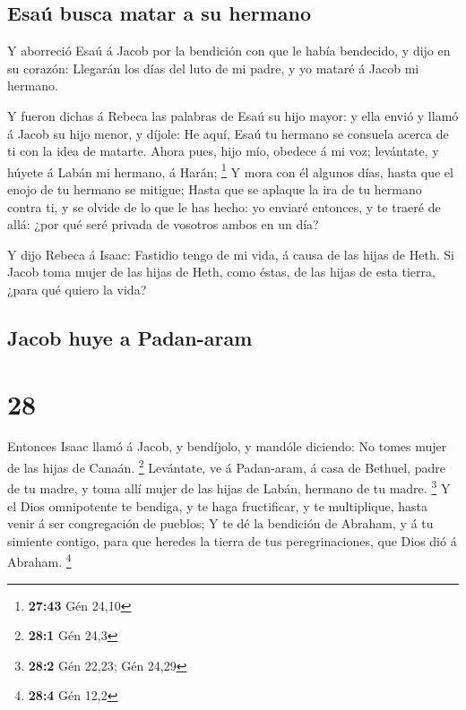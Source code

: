 \hypertarget{esauxfa-busca-matar-a-su-hermano}{%
\subsection{Esaú busca matar a su
hermano}\label{esauxfa-busca-matar-a-su-hermano}}

 Y aborreció Esaú á Jacob por la bendición con que le había
bendecido, y dijo en su corazón: Llegarán los días del luto de mi padre,
y yo mataré á Jacob mi hermano.

 Y fueron dichas á Rebeca las palabras de Esaú su hijo
mayor: y ella envió y llamó á Jacob su hijo menor, y díjole: He aquí,
Esaú tu hermano se consuela acerca de ti con la idea de matarte.
 Ahora pues, hijo mío, obedece á mi voz; levántate, y
húyete á Labán mi hermano, á Harán; \footnote{\textbf{27:43} Gén 24,10}
 Y mora con él algunos días, hasta que el enojo de tu
hermano se mitigue;  Hasta que se aplaque la ira de tu
hermano contra ti, y se olvide de lo que le has hecho: yo enviaré
entonces, y te traeré de allá: ¿por qué seré privada de vosotros ambos
en un día?

 Y dijo Rebeca á Isaac: Fastidio tengo de mi vida, á causa
de las hijas de Heth. Si Jacob toma mujer de las hijas de Heth, como
éstas, de las hijas de esta tierra, ¿para qué quiero la vida?

\hypertarget{jacob-huye-a-padan-aram}{%
\subsection{Jacob huye a Padan-aram}\label{jacob-huye-a-padan-aram}}

\hypertarget{section-27}{%
\section{28}\label{section-27}}

 Entonces Isaac llamó á Jacob, y bendíjolo, y mandóle
diciendo: No tomes mujer de las hijas de Canaán. \footnote{\textbf{28:1}
  Gén 24,3}  Levántate, ve á Padan-aram, á casa de Bethuel,
padre de tu madre, y toma allí mujer de las hijas de Labán, hermano de
tu madre. \footnote{\textbf{28:2} Gén 22,23; Gén 24,29}  Y
el Dios omnipotente te bendiga, y te haga fructificar, y te multiplique,
hasta venir á ser congregación de pueblos;  Y te dé la
bendición de Abraham, y á tu simiente contigo, para que heredes la
tierra de tus peregrinaciones, que Dios dió á Abraham. \footnote{\textbf{28:4}
  Gén 12,2}

